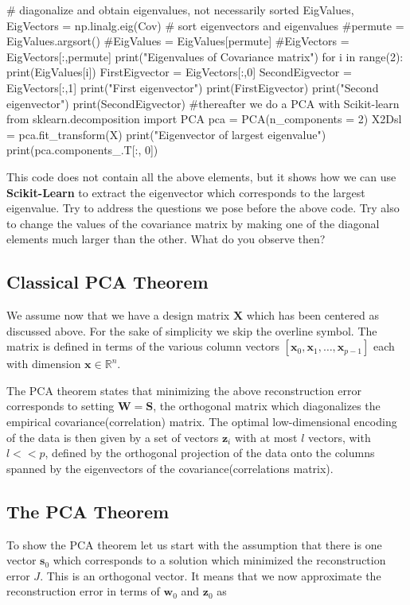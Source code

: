 \documentclass[%
oneside,                 %
final,                   %
10pt]{article}
\begin{document}
\bpycod
# diagonalize and obtain eigenvalues, not necessarily sorted
EigValues, EigVectors = np.linalg.eig(Cov)
# sort eigenvectors and eigenvalues
#permute = EigValues.argsort()
#EigValues = EigValues[permute]
#EigVectors = EigVectors[:,permute]
print("Eigenvalues of Covariance matrix")
for i in range(2):
    print(EigValues[i])
FirstEigvector = EigVectors[:,0]
SecondEigvector = EigVectors[:,1]
print("First eigenvector")
print(FirstEigvector)
print("Second eigenvector")
print(SecondEigvector)
#thereafter we do a PCA with Scikit-learn
from sklearn.decomposition import PCA
pca = PCA(n_components = 2)
X2Dsl = pca.fit_transform(X)
print("Eigenvector of largest eigenvalue")
print(pca.components_.T[:, 0])


\epycod

This code does not contain all the above elements, but it shows how we can use \textbf{Scikit-Learn} to extract the eigenvector which corresponds to the largest eigenvalue. Try to address the questions we pose before the above code.  Try also to change the values of the covariance matrix by making one of the diagonal elements much larger than the other. What do you observe then? 

\subsection{Classical PCA Theorem}

We assume now that we have a design matrix $\bm{X}$ which has been
centered as discussed above. For the sake of simplicity we skip the
overline symbol. The matrix is defined in terms of the various column
vectors $[\bm{x}_0,\bm{x}_1,\dots, \bm{x}_{p-1}]$ each with dimension
$\bm{x}\in {\mathbb{R}}^{n}$.

The PCA theorem states that minimizing the above reconstruction error
corresponds to setting $\bm{W}=\bm{S}$, the orthogonal matrix which
diagonalizes the empirical covariance(correlation) matrix. The optimal
low-dimensional encoding of the data is then given by a set of vectors
$\bm{z}_i$ with at most $l$ vectors, with $l << p$, defined by the
orthogonal projection of the data onto the columns spanned by the
eigenvectors of the covariance(correlations matrix).

\subsection{The PCA Theorem}

To show the PCA theorem let us start with the assumption that there is one vector $\bm{s}_0$ which corresponds to a solution which minimized the reconstruction error $J$. This is an orthogonal vector. It means that we now approximate the reconstruction error in terms of $\bm{w}_0$ and $\bm{z}_0$ as
\end{document}
